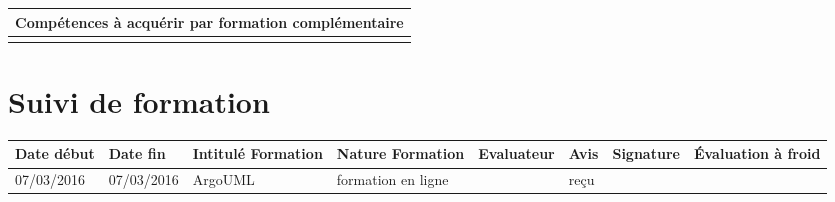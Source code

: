 \documentclass[11pt]{article}
\begin{document}
\begin{table}[!hp]
\centering
	\begin{tabularx}{\linewidth}{|X|}
	\hline
	\rowcolor{gray!40} Compétences à acquérir par formation complémentaire \\
	\hline
	  \\
	\hline
	\end{tabularx}
\end{table}

\section*{\large Suivi de formation}

\begin{table}[!hp]
\centering
	\begin{tabularx}{\linewidth}{|p{1.9cm}|p{1.9cm}|p{1.9cm}|p{1.9cm}|p{1cm}|p{1.5cm}|p{1.5cm}|p{1.5cm}|}
	\hline
	\rowcolor{gray!40} \tiny Date début & \tiny Date fin & \tiny Intitulé Formation & \tiny Nature Formation & \tiny Evaluateur & \tiny Avis & \tiny Signature & \tiny Évaluation à froid \\
	\hline
	07/03/2016 &07/03/2016 &ArgoUML &formation en ligne &\Julie &reçu & & \\
	\hline
	\end{tabularx}
\end{table}
\end{document}
